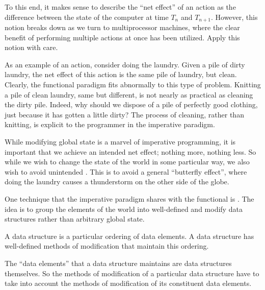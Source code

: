 To this end, it makes sense to describe the ``net effect'' of an action as the
difference between the state of the computer at time $T_n$ and $T_{n+1}$.
However, this notion breaks down as we turn to multiprocessor machines, where
the clear benefit of performing multiple actions at once has been utilized.
Apply this notion with care.


As an example of an action, consider doing the laundry. Given a pile of dirty
laundry, the net effect of this action is the same pile of laundry, but clean.
Clearly, the functional paradigm fits abnormally to this type of problem.
Knitting a pile of clean laundry, same but different, is not nearly as
practical as cleaning the dirty pile. Indeed, why should we dispose of a pile
of perfectly good clothing, just because it has gotten a little dirty? The
process of cleaning, rather than knitting, is explicit to the programmer in the
imperative paradigm.

While modifying global state is a marvel of imperative programming, it is
important that we achieve an intended net effect; nothing more, nothing less.
So while we wish to change the state of the world in some particular way, we
also wish to avoid unintended .  This is to avoid a general
``butterfly effect'', where doing the laundry causes a thunderstorm on the
other side of the globe.


One technique that the imperative paradigm shares with the functional is
. The idea is to group the elements of the world into
well-defined  and modify data structures rather than
arbitrary global state.

\begin{definition}

A data structure is a particular ordering of data elements. A data structure
has well-defined methods of modification that maintain this
ordering.

\end{definition}

The ``data elements'' that a data structure maintains are data structures
themselves. So the methods of modification of a particular data structure have
to take into account the methods of modification of its constituent data
elements.

